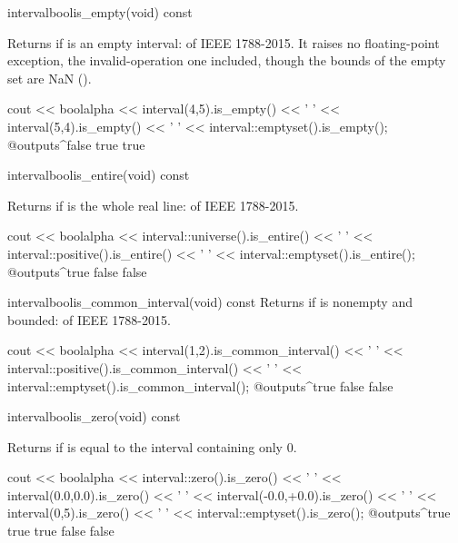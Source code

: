 \begin{defmethod}{interval}{bool}{is\_empty}{(void) const}
  \begin{operation}
  \end{operation}
  Returns  if  is an empty interval:  of
  IEEE 1788-2015. It raises no floating-point exception, the
  invalid-operation one included, though the bounds of the empty set are NaN
  ().\newinvfive
  \begin{example}
cout << boolalpha << interval(4,5).is_empty() << ' '
     << interval(5,4).is_empty() << ' '
     << interval::emptyset().is_empty();
@outputs^false true true~
  \end{example}
\end{defmethod}

\begin{defmethod}{interval}{bool}{is\_entire}{(void) const}
  \begin{operation}
  \end{operation}
  Returns  if  is the whole real line: 
  of IEEE 1788-2015.\newinvfive
  \begin{example}
cout << boolalpha << interval::universe().is_entire() << ' '
     << interval::positive().is_entire() << ' '
     << interval::emptyset().is_entire();
@outputs^true false false~
  \end{example}
\end{defmethod}

\begin{defmethod}{interval}{bool}{is\_common\_interval}{(void) const}
  Returns  if  is nonempty and bounded:
   of IEEE 1788-2015.\newinvfive
  \begin{example}
cout << boolalpha << interval(1,2).is_common_interval() << ' '
     << interval::positive().is_common_interval() << ' '
     << interval::emptyset().is_common_interval();
@outputs^true false false~
  \end{example}
\end{defmethod}

\begin{defmethod}{interval}{bool}{is\_zero}{(void) const}
  \begin{operation}
  \end{operation}
  Returns  if  is equal to the interval containing
  only $0$.
  \begin{example}
cout << boolalpha << interval::zero().is_zero() << ' '
     << interval(0.0,0.0).is_zero() << ' '
     << interval(-0.0,+0.0).is_zero() << ' '
     << interval(0,5).is_zero() << ' '
     << interval::emptyset().is_zero();
@outputs^true true true false false~
  \end{example}
\end{defmethod}

